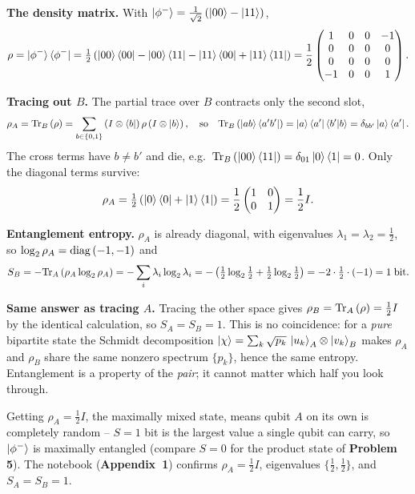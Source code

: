 \documentclass[a4paper, 10pt]{article}
\begin{document}
\begin{solution}
	\noindent \textbf{The density matrix.} With \( \ket{\phi^-} = \tfrac{1}{\sqrt{2}}\left(\ket{00} - \ket{11}\right) \),
	\[
		\rho = \ket{\phi^-}\bra{\phi^-}
		= \tfrac{1}{2}\left( \ket{00}\bra{00} - \ket{00}\bra{11} - \ket{11}\bra{00} + \ket{11}\bra{11} \right)
		= \frac{1}{2}\begin{pmatrix}
			1  & 0 & 0 & -1 \\
			0  & 0 & 0 & 0  \\
			0  & 0 & 0 & 0  \\
			-1 & 0 & 0 & 1
		\end{pmatrix}.
	\]

	\noindent \textbf{Tracing out \( B \).} The partial trace over \( B \) contracts only the second slot,
	\[
		\rho_A = \mathrm{Tr}_B\left(\rho\right) = \sum_{b \in \{0, 1\}} \left(I \otimes \bra{b}\right) \rho \left(I \otimes \ket{b}\right),
		\quad\text{so}\quad
		\mathrm{Tr}_B \left( \ket{a b}\bra{a' b'} \right) = \ket{a}\bra{a'} \braket{b' \vert b} = \delta_{b b'} \ket{a}\bra{a'} .
	\]
	The cross terms have \( b \ne b' \) and die, e.g.\ \( \mathrm{Tr}_B\left(\ket{00}\bra{11}\right) = \delta_{01}\ket{0}\bra{1} = 0 \).
	Only the diagonal terms survive:
	\[
		\rho_A = \tfrac{1}{2}\left( \ket{0}\bra{0} + \ket{1}\bra{1} \right)
		= \frac{1}{2}\begin{pmatrix} 1 & 0 \\ 0 & 1 \end{pmatrix}
		= \frac{1}{2}I .
	\]

	\noindent \textbf{Entanglement entropy.} \( \rho_A \) is already diagonal, with eigenvalues \( \lambda_1 = \lambda_2 = \tfrac{1}{2} \), so \( \log_2 \rho_A = \mathrm{diag}\left(-1, -1\right) \) and
	\[
		S_B = -\mathrm{Tr}_A\left(\rho_A \log_2 \rho_A\right)
		= -\sum_i \lambda_i \log_2 \lambda_i
		= -\left( \tfrac{1}{2}\log_2 \tfrac{1}{2} + \tfrac{1}{2}\log_2 \tfrac{1}{2} \right)
		= -2 \cdot \tfrac{1}{2} \cdot (-1)
		= 1 \; \text{bit}.
	\]

	\noindent \textbf{Same answer as tracing \( A \).} Tracing the other space gives \( \rho_B = \mathrm{Tr}_A\left(\rho\right) = \tfrac{1}{2}I \) by the identical calculation, so \( S_A = S_B = 1 \).
	This is no coincidence: for a \emph{pure} bipartite state the Schmidt decomposition \( \ket{\chi} = \sum_k \sqrt{p_k}\,\ket{u_k}_A \otimes \ket{v_k}_B \) makes \( \rho_A \) and \( \rho_B \) share the same nonzero spectrum \( \{p_k\} \), hence the same entropy.
	Entanglement is a property of the \emph{pair}; it cannot matter which half you look through.

	\noindent Getting \( \rho_A = \tfrac{1}{2}I \), the maximally mixed state, means qubit \( A \) on its own is completely random -- \( S = 1 \) bit is the largest value a single qubit can carry, so \( \ket{\phi^-} \) is maximally entangled (compare \( S = 0 \) for the product state of \textbf{Problem 5}).
	The notebook (\textbf{Appendix~1}) confirms \( \rho_A = \tfrac{1}{2}I \), eigenvalues \( \{ \tfrac{1}{2}, \tfrac{1}{2} \} \), and \( S_A = S_B = 1 \).
\end{solution}
\end{document}
